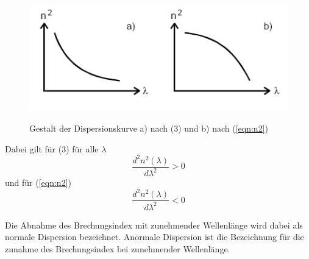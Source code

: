 \begin{figure}[H]
\centering
\includegraphics[width=\textwidth]{n.png}
\caption{Gestalt der Dispersionskurve a) nach (3) und b) nach (\ref{eqn:n2})}\cite{anleitung}
\label{fig:n}
\end{figure}

Dabei gilt für (3) für alle $\lambda$
\begin{equation*}
  \frac{d^2n^2(\lambda)}{d\lambda^2}>0
\end{equation*}
und für (\ref{eqn:n2})
\begin{equation*}
  \frac{d^2n^2(\lambda)}{d\lambda^2}<0
\end{equation*}

Die Abnahme des Brechungsindex mit zunehmender Wellenlänge wird dabei als normale Dispersion bezeichnet.
Anormale Dispersion ist die Bezeichnung für die zunahme des Brechungsindex bei zunehmender Wellenlänge.


